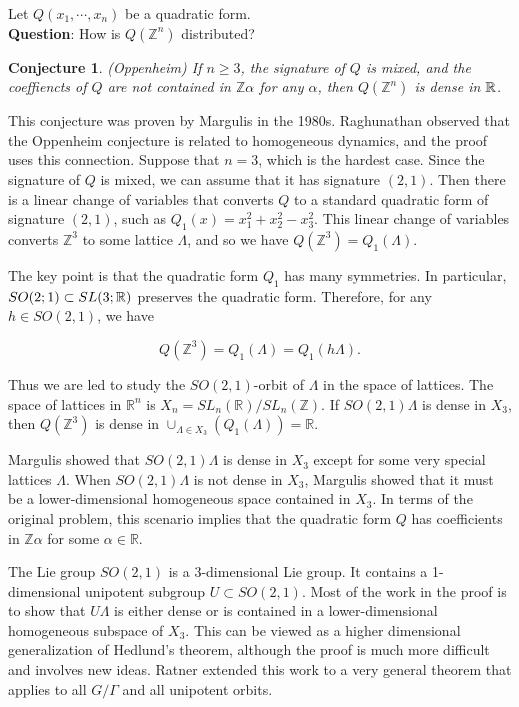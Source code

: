 \documentclass[12pt]{amsart}
\newtheorem{conj}[theorem]{Conjecture}
\newcommand{\ZZ}{\mathbb{Z}}
\newcommand{\RR}{\mathbb{R}}
\newcommand{\Z}{\mathbb{Z}}
\begin{document}
Let $Q(x_1,\cdots, x_n)$ be a quadratic form. \\
\textbf{Question}: How is $Q(\Z^n)$ distributed? 
\begin{conj}(Oppenheim) If $n\geq 3$, the signature of $Q$ is mixed, and the coeffiencts of $Q$ are not contained in $\Z\alpha$ for any $\alpha$, then $Q(\Z^n)$ is dense in $\mathbb{R}$. 
\end{conj}

This conjecture was proven by Margulis in the 1980s.  Raghunathan observed that the Oppenheim conjecture is related to homogeneous dynamics, and the proof uses this connection.  
Suppose that $n=3$, which is the hardest case.  Since the signature of $Q$ is mixed, we can assume that it has signature $(2,1)$.  Then there is a linear change of variables that converts $Q$ to a standard quadratic form of signature $(2,1)$, such as $Q_1(x) = x_1^2 + x_2^2 - x_3^2$.  This linear change of variables converts $\ZZ^3$ to some lattice $\Lambda$, and so we have $Q(\ZZ^3) = Q_1(\Lambda)$.  

The key point is that the quadratic form $Q_1$ has many symmetries.  In particular, $SO(2;1) \subset SL(3;\mathbb{R})$ preserves the quadratic form.  Therefore, for any $h \in SO(2,1)$, we have

$$ Q(\ZZ^3) = Q_1(\Lambda) = Q_1 (h \Lambda). $$

Thus we are led to study the $SO(2,1)$-orbit of $\Lambda$ in the space of lattices.  The space of lattices in $\RR^n$ is $X_n = SL_n(\RR) / SL_n(\ZZ)$.  If $SO(2,1) \Lambda$ is dense in $X_3$, then $Q(\ZZ^3)$ is dense in $\cup_{\Lambda \in X_3}(Q_1(\Lambda)) = \RR$.

Margulis showed that $SO(2,1) \Lambda$ is dense in $X_3$ except for some very special lattices $\Lambda$.  When $SO(2,1) \Lambda$ is not dense in $X_3$, Margulis showed that it must be a lower-dimensional homogeneous space contained in $X_3$.  In terms of the original problem, this scenario implies that the quadratic form $Q$ has coefficients in $\ZZ \alpha$ for some $\alpha \in \RR$.  

The Lie group $SO(2,1)$ is a 3-dimensional Lie group.  It contains a 1-dimensional unipotent subgroup $U \subset SO(2,1)$.  Most of the work in the proof is to show that $U \Lambda$ is either dense or is contained in a lower-dimensional homogeneous subspace of $X_3$.  This can be viewed as a higher dimensional generalization of Hedlund's theorem, although the proof is much more difficult and involves new ideas.  Ratner extended this work to a very general theorem that applies to all $G/ \Gamma$ and all unipotent orbits.
\end{document}
